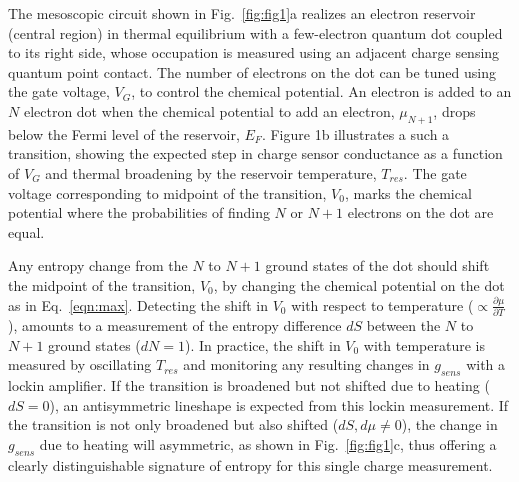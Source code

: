 \documentclass[twocolumn,showpacs,preprintnumbers,amsmath,amssymb,pra,aps,superscriptaddress]{revtex4-1}
\begin{document}
The mesoscopic circuit shown in Fig.~\ref{fig:fig1}a realizes an electron reservoir (central region) in thermal equilibrium with a few-electron quantum dot coupled to its right side, whose occupation is measured using an adjacent charge sensing quantum point contact\cite{Staring2007, Frolov2009, Thierschmann2015}. The number of electrons on the dot can be tuned using the gate voltage, $V_G$, to control the chemical potential.  An electron is added to an $N$ electron dot when the chemical potential to add an electron, $\mu_{N+1}$, drops below the Fermi level of the reservoir, $E_F$.  Figure 1b illustrates a such a transition, showing the expected step in charge sensor conductance as a function of $V_G$ and thermal broadening by the reservoir temperature, $T_{res}$. The gate voltage corresponding to midpoint of the transition, $V_0$, marks the chemical potential where the probabilities of finding $N$ or $N+1$ electrons on the dot are equal.

Any entropy change from the $N$ to $N+1$ ground states of the dot should shift the midpoint of the transition, $V_0$, by changing the chemical potential on the dot as in Eq.~\ref{eqn:max}.  Detecting the shift in $V_0$ with respect to temperature (${\propto}\frac{\partial \mu}{\partial T}$), amounts to a measurement of the entropy difference $dS$ between the $N$ to $N+1$ ground states ($dN=1$).  In practice, the shift in $V_0$ with temperature is measured by oscillating $T_{res}$ and monitoring any resulting changes in $g_{sens}$ with a lockin amplifier.  If the transition is broadened but not shifted due to heating ($dS=0$), an antisymmetric lineshape is expected from this lockin measurement.  If the transition is not only broadened but also shifted ($dS,d\mu\neq0$), the change in $g_{sens}$ due to heating will asymmetric, as shown in Fig.~\ref{fig:fig1}c, thus offering a clearly distinguishable signature of entropy for this single charge measurement.
\end{document}
